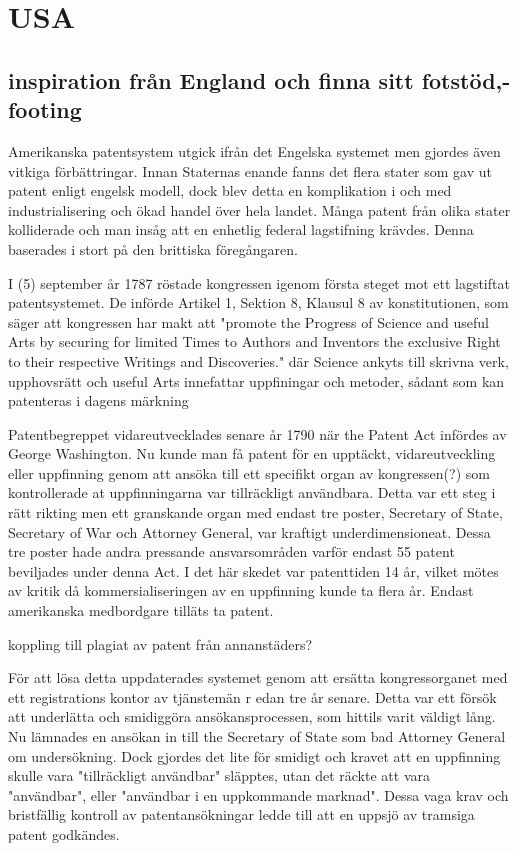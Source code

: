 \section{USA} %

\subsection{inspiration från England och finna sitt fotstöd,- footing} %
\label{sub:inspiration_från_england}

Amerikanska patentsystem utgick ifrån det Engelska systemet men gjordes även vitkiga förbättringar. Innan
Staternas enande fanns det flera stater som gav ut patent enligt engelsk modell, dock blev detta en
komplikation i och med industrialisering och ökad handel över hela landet. Många patent från olika stater
kolliderade och man insåg att en enhetlig federal lagstifning krävdes. Denna baserades i stort på den
brittiska föregångaren.

I (5) september år 1787 röstade kongressen igenom första steget mot ett lagstiftat patentsystemet. De
införde Artikel 1, Sektion 8, Klausul 8 av konstitutionen, som säger att kongressen har makt att "promote
the Progress of Science and useful Arts by securing for limited Times to Authors and Inventors the
exclusive Right to their respective Writings and Discoveries." där Science ankyts till skrivna verk,
upphovsrätt och useful Arts innefattar uppfiningar och metoder, sådant som kan patenteras i dagens märkning

Patentbegreppet vidareutvecklades senare år 1790 när the Patent Act infördes av George Washington. Nu kunde
man få patent för en upptäckt, vidareutveckling eller uppfinning genom att ansöka till ett specifikt organ
av kongressen(?) som kontrollerade at uppfinningarna var tillräckligt användbara. Detta var ett steg i rätt
rikting men ett granskande organ med endast tre poster, Secretary of State, Secretary of War och Attorney
General, var kraftigt underdimensioneat. Dessa tre poster hade andra pressande ansvarsområden varför endast
55 patent beviljades under denna Act. I det här skedet var patenttiden 14 år, vilket mötes av kritik då
kommersialiseringen av en uppfinning kunde ta flera år. Endast amerikanska medbordgare tilläts ta patent.

koppling till plagiat av patent från annanstäders?

För att lösa detta uppdaterades systemet genom att ersätta kongressorganet med ett registrations kontor av
tjänstemän r edan tre år senare. Detta var ett försök att underlätta och smidiggöra ansökansprocessen, som
hittils varit väldigt lång. Nu lämnades en ansökan in till the Secretary of State som bad Attorney General
om undersökning. Dock gjordes det lite för smidigt och kravet att en uppfinning skulle vara "tillräckligt
användbar" släpptes, utan det räckte att vara "användbar", eller "användbar i en uppkommande marknad".
Dessa vaga krav och bristfällig kontroll av patentansökningar ledde till att en uppsjö av tramsiga patent
godkändes.

